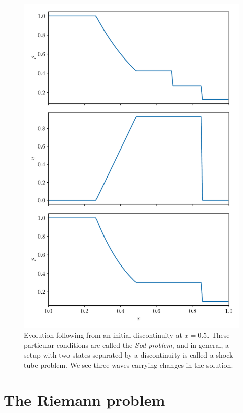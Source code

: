\begin{figure}
\centering
\includegraphics[width=0.8\linewidth]{riemann-sod}
\caption[The Sod problem]{\label{fig:sod} Evolution following from an initial
  discontinuity at $x = 0.5$.  These particular conditions are called
  the {\em Sod problem}, and in general, a setup with two states
  separated by a discontinuity is called a shock-tube problem.  We see three
  waves carrying changes in the solution. \\
  }
\end{figure}






\section{The Riemann problem}

\label{euler:sec:riemann}

